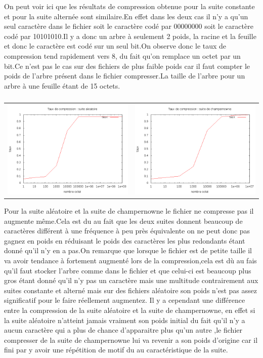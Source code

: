 \documentclass{report}
\begin{document}
On peut voir ici que les  résultats de compression obtenue pour la suite constante et pour la suite alternée sont similaire.En effet dans les deux cas il n'y a qu'un seul caractère dans le fichier soit le caractère codé par 00000000 soit le caractère codé par 10101010.Il y a donc un arbre à seulement 2 poids, la racine et la feuille et donc le caractère est codé sur un seul bit.On observe donc le taux de compression tend rapidement vers 8, du fait qu'on remplace un octet par un bit.Ce n'est pas le cas sur des fichiers de plus faible poids car il faut compter le poids de l'arbre présent dans le fichier compresser.La taille de l'arbre  pour un arbre à une feuille étant de 15 octets.
\subparagraph*{}
\hspace{-2cm}\begin{tabular}{l | l}
\includegraphics[width=7cm]{aleaH.png} & 
\includegraphics[width=7cm]{champH.png}
\end{tabular}
Pour la suite aléatoire et la suite de champernowne le fichier ne compresse pas il augmente même.Cela est du au fait que les deux suites donnent beaucoup de caractères différent à une fréquence à peu près équivalente on ne peut donc pas gagnez en poids en réduisant le poids des caractères les plus redondants étant donné qu'il n'y en a pas.On remarque que lorsque le fichier est de petite taille il va avoir tendance à fortement augmenté lors de la compression,cela est dù au fais qu'il faut stocker l'arbre comme dans le fichier et que celui-ci est beaucoup plus gros étant donné qu'il n'y pas un caractère mais une multitude contrairement aux suites constante et alterné mais sur des fichiers aléatoire son poids n'est pas assez significatif pour le faire réellement augmentez.
Il y a cependant une différence entre la compression de la suite aléatoire et la suite de champernowne, en effet si la suite aléatoire  n'atteint jamais vraiment son poids initial du fait qu'il n'y a aucun caractère qui a plus de chance d'apparaitre plus qu'un autre ,le fichier compresser de la suite de champernowne lui va revenir a son poids d'origine car il fini par y avoir une répétition de motif du au caractéristique de la suite.
\end{document}
